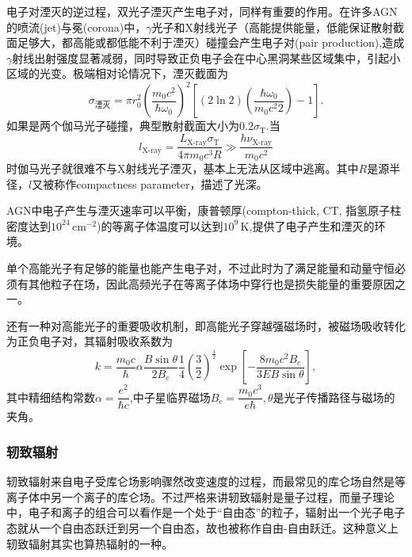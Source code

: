 \documentclass[../天体物理基础.tex]{subfiles}
\begin{document}
电子对湮灭的逆过程，双光子湮灭产生电子对，同样有重要的作用。在许多AGN的喷流(jet)与冕(corona)中，$\gamma$光子和X射线光子（高能提供能量，低能保证散射截面足够大，都高能或都低能不利于湮灭）碰撞会产生电子对(pair production),造成$\gamma$射线出射强度显著减弱，同时导致正负电子会在中心黑洞某些区域集中，引起小区域的光变。极端相对论情况下，湮灭截面为
\begin{equation}
\sigma_{\text{湮灭}}=\pi r_{0}^{2}\left(\frac{m_{0}c^{2}}{\hbar\omega_{0}}\right)^{2}\left[\left(2\ln2\right)\left(\frac{\hbar\omega_{0}}{m_{0}c^{2}2}\right)-1\right].
\end{equation}
如果是两个伽马光子碰撞，典型散射截面大小为$0.2\sigma_{\text{T}}$.当
\begin{equation}
l_{\text{X-ray}}=\frac{L_{\text{X-ray}}\sigma_{\text{T}}}{4\pi m_{0}c^{3}R}\gg\frac{h\nu_{\text{X-ray}}}{m_{0}c^{2}}
\end{equation}
时伽马光子就很难不与X射线光子湮灭，基本上无法从区域中逃离。其中$R$是源半径，$l$又被称作compactness parameter，描述了光深。

AGN中电子产生与湮灭速率可以平衡，康普顿厚(compton-thick, CT, 指氢原子柱密度达到$10^{24}\,\mathrm{cm^{-2}}$)的等离子体温度可以达到$10^{9}\,\mathrm{K}$,提供了电子产生和湮灭的环境。

单个高能光子有足够的能量也能产生电子对，不过此时为了满足能量和动量守恒必须有其他粒子在场，因此高频光子在等离子体场中穿行也是损失能量的重要原因之一。

还有一种对高能光子的重要吸收机制，即高能光子穿越强磁场时，被磁场吸收转化为正负电子对，其辐射吸收系数为
\begin{equation}
k=\frac{m_{0}c}{\hbar}\alpha\frac{B\sin\theta}{2B_{c}}\frac{1}{4}\left(\frac{3}{2}\right)^{\frac{1}{2}}\exp\left[-\frac{8m_{0}c^{2}B_{c}}{3EB\sin\theta}\right],
\end{equation}
其中精细结构常数$\alpha=\dfrac{e^{2}}{\hbar c}$,中子星临界磁场$B_{c}=\dfrac{m_{0}c^{3}}{e\hbar},\theta$是光子传播路径与磁场的夹角。

\subsubsection{轫致辐射}
轫致辐射来自电子受库仑场影响骤然改变速度的过程，而最常见的库仑场自然是等离子体中另一个离子的库仑场。不过严格来讲轫致辐射是量子过程，而量子理论中，电子和离子的组合可以看作是一个处于“自由态”的粒子，辐射出一个光子电子态就从一个自由态跃迁到另一个自由态，故也被称作自由-自由跃迁。这种意义上轫致辐射其实也算热辐射的一种。
\end{document}
